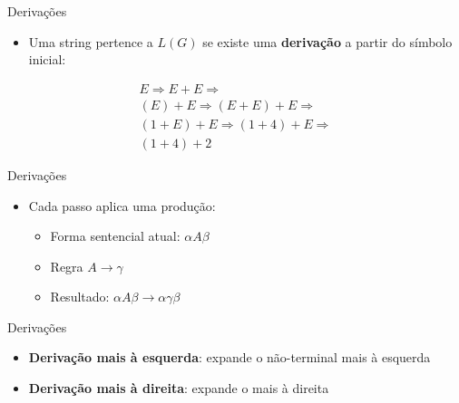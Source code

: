 \begin{frame}{Derivações}

    \begin{itemize}

        \item
        Uma string pertence a \(L(G)\) se existe uma \textbf{derivação} a
        partir do símbolo inicial:
    \end{itemize}

    \[
    \begin{array}{l}
        E \Rightarrow E+E \Rightarrow \\
        (E)+E \Rightarrow (E+E)+E \Rightarrow \\
        (1+E)+E \Rightarrow (1+4)+E \Rightarrow\\
        (1+4)+2
    \end{array}
    \]
\end{frame}

\begin{frame}{Derivações}

    \begin{itemize}

        \item
        Cada passo aplica uma produção:

        \begin{itemize}

            \item
            Forma sentencial atual: \(\alpha A \beta\)
            \item
            Regra \(A \to \gamma\)
            \item
            Resultado: \(\alpha A \beta \to \alpha \gamma \beta\)
        \end{itemize}
    \end{itemize}
\end{frame}

\begin{frame}{Derivações}

    \begin{itemize}

        \item
        \textbf{Derivação mais à esquerda}: expande o não-terminal mais à
        esquerda
        \item
        \textbf{Derivação mais à direita}: expande o mais à direita
    \end{itemize}
\end{frame}

